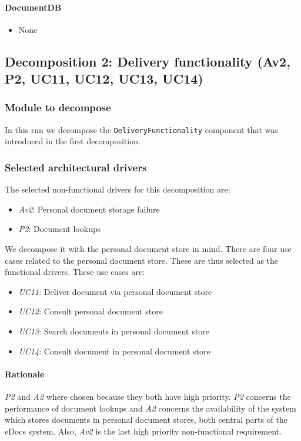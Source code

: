 \documentclass[a4paper,10pt]{article}
\begin{document}
\paragraph{DocumentDB}
\begin{itemize}
	\item None
\end{itemize}



\subsection{Decomposition 2: Delivery functionality (Av2, P2, UC11, UC12, UC13, UC14)}
\subsubsection{Module to decompose}
In this run we decompose the \texttt{DeliveryFunctionality} component that was introduced in the first decomposition. 

\subsubsection{Selected architectural drivers}
The selected non-functional drivers for this decomposition are:

\begin{itemize}
	\item \emph{Av2}: Personal document storage failure
	\item \emph{P2}: Document lookups
\end{itemize}

We decompose it with the personal document store in mind. There are four use cases related to the personal document store. These are thus selected as the functional drivers. These use cases are: 

\begin{itemize}
	\item \emph{UC11}: Deliver document via personal document store
	\item \emph{UC12}: Consult personal document store
	\item \emph{UC13}: Search documents in personal document store
	\item \emph{UC14}: Consult document in personal document store
\end{itemize}

\paragraph{Rationale} \emph{P2} and \emph{A2} where chosen because they both have high priority. \emph{P2} concerns the performance of document lookups and  \emph{A2} concerns the availability of the system which stores documents in personal document stores, both central parts of the eDocs system. Also, \emph{Av2} is the last high priority non-functional requirement.
\end{document}
